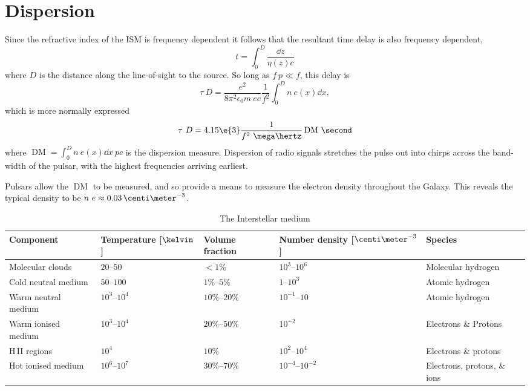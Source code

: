 \section{Dispersion}
\label{sec:dispersion}

Since the refractive index of the ISM is frequency dependent it
follows that the resultant time delay is also frequency dependent,
\begin{equation}
  \label{eq:105}
  t = \int_0^D \frac{\dd{z}}{\eta(z) c}
\end{equation}
where $D$ is the distance along the line-of-sight to the source. So
long as $f~p \ll f$, this delay is
\begin{equation}
  \label{eq:106}
  \tau~D = \frac{e^2}{8 \pi^2 \epsilon_0 m~e c} \frac{1}{f^2} \int_0^D n~e(x) \dd{x},
\end{equation}
which is more normally expressed
\providecommand{\DM}{\operatorname{DM}}
\begin{equation}
  \label{eq:107}
  \tau~D = 4.15\e{3} \frac{1}{f^2~{\mega\hertz}} \DM\,\second
\end{equation}
where $\DM = \int_0^D n~e(x) \dd{x~{pc}}$ is the dispersion
measure. Dispersion of radio signals stretches the pulse out into
chirps across the band-width of the pulsar, with the highest
frequencies arriving earliest.

Pulsars allow the $\DM$ to be measured, and so provide a means to
measure the electron density throughout the Galaxy. This reveals the
typical density to be $n~e \approx 0.03\,\centi\meter^{-3}$.

\begin{table*}
  \centering
  \begin{tabular}{lllll}
    \toprule
    Component           & Temperature [$\kelvin$] & Volume fraction & Number density [$\centi\meter^{-3}$] & Species              \\ 
    \midrule
    Molecular clouds    & $20$--$50$              & $<1 \%$         & $10^3$--$10^6$                       & Molecular hydrogen   \\
    Cold neutral medium & $50$--$100$             & $1\%$--$5\%$    & $1$--$10^3$                          & Atomic hydrogen      \\
Warm neutral medium     & $10^3$--$10^4$          & $10\%$--$20\%$  & $10^{-1}$--$10$                      & Atomic hydrogen      \\
\midrule
Warm ionised medium     & $10^3$--$10^4$          & $20\%$--$50\%$  & $10^{-2}$                            & Electrons \& Protons \\
H\,II regions           & $10^4$                  & $10\%$          & $10^2$--$10^4$                       & Electrons \& protons \\
Hot ionised medium      & $10^6$--$10^7$          & $30\%$--$70\%$  & $10^{-4}$--$10^{-2}$                 & Electrons, protons, \& ions \\
    \bottomrule
  \end{tabular}
  \caption{The Interstellar medium}
  \label{tab:ism}
\end{table*}

